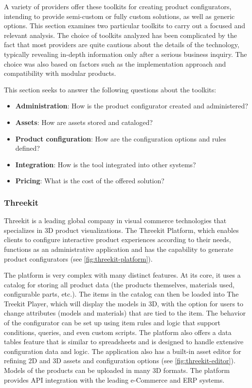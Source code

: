 A variety of providers offer these toolkits for creating product configurators, intending to provide semi-custom or fully custom solutions, as well as generic options. This section examines two particular toolkits to carry out a focused and relevant analysis. The choice of toolkits analyzed has been complicated by the fact that most providers are quite cautious about the details of the technology, typically revealing in-depth information only after a serious business inquiry. The choice was also based on factors such as the implementation approach and compatibility with modular products.

\noindent This section seeks to answer the following questions about the toolkits: 
\begin{itemize}[label=\rectanglebullet]
    \item \textbf{Administration}: How is the product configurator created and administered?
    \item \textbf{Assets}: How are assets stored and cataloged?
    \item \textbf{Product configuration}: How are the configuration options and rules defined?
    \item \textbf{Integration}: How is the tool integrated into other systems?
    \item \textbf{Pricing}: What is the cost of the offered solution?
\end{itemize}
\subsubsection{Threekit}

Threekit is a leading global company in visual commerce technologies that specializes in 3D product visualizations. The Threekit Platform, which enables clients to configure interactive product experiences according to their needs, functions as an administrative application and has the capability to generate product configurators (see \autoref{fig:threekit-platform}). \cite{ThreeKitAboutUs, ThreeKitPlatform}

The platform is very complex with many distinct features. At its core, it uses a catalog for storing all product data (the products themselves, materials used, configurable parts, etc.). The items in the catalog can then be loaded into The Treekit Player, which will display the models in 3D, with the option for users to change attributes (models and materials) that are tied to the item. The behavior of the configurator can be set up using item rules and logic that support conditions, queries, and even custom scripts. The platform also offers a data tables feature that is similar to spreadsheets and is designed to handle extensive configuration data and logic. The application also has a built-in asset editor for refining 2D and 3D assets and configuration options (see \autoref{fig:threekit-editor}). Models of the products can be uploaded in many 3D formats. The platform provides API integration with the leading e-Commerce and ERP systems. \cite{ThreeKitPlatformDocumentation}

